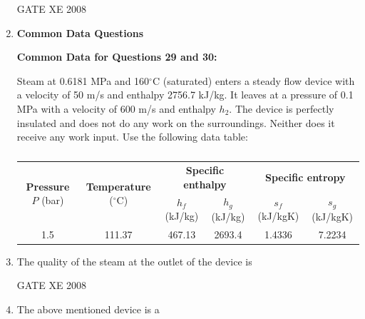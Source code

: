 \documentclass[12pt]{article}
\begin{document}
\begin{enumerate}[label=Q\arabic*.]
GATE XE 2008  


\item[] \textbf{\Large Common Data Questions}

\textbf{Common Data for Questions 29 and 30:}  

Steam at 0.6181 MPa and 160$^\circ$C (saturated) enters a steady flow device with a velocity of 50 m/s and enthalpy 2756.7 kJ/kg. It leaves at a pressure of 0.1 MPa with a velocity of 600 m/s and enthalpy $h_2$. The device is perfectly insulated and does not do any work on the surroundings. Neither does it receive any work input. Use the following data table:  

\begin{table}[H]     \centering     \caption{}     \label{}     \begin{tabular}{|c|c|c|c|c|c|}
\hline
\multirow{2}{*}{\textbf{Pressure} $P$ (bar)} & 
\multirow{2}{*}{\textbf{Temperature} ($^{\circ}$C)} & 
\multicolumn{2}{c|}{\textbf{Specific enthalpy}} & 
\multicolumn{2}{c|}{\textbf{Specific entropy}} \\ \cline{3-6}
 & & $h_f$ (kJ/kg) & $h_g$ (kJ/kg) & $s_f$ (kJ/kgK) & $s_g$ (kJ/kgK) \\ \hline
1.5 & 111.37 & 467.13 & 2693.4 & 1.4336 & 7.2234 \\ \hline
\end{tabular} \end{table}


\item The quality of the steam at the outlet of the device is  
\begin{enumerate}[label=(\Alph*)]
\end{enumerate}

 GATE XE 2008  

\item The above mentioned device is a  

\begin{enumerate}[label=(\Alph*)]
\end{enumerate}


\end{enumerate}
\end{document}
